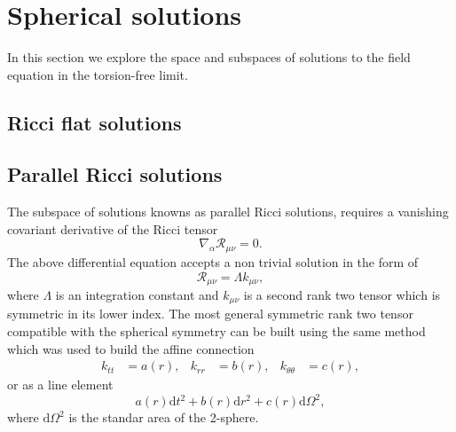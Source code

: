 \documentclass{article}
\begin{document}
\section{Spherical solutions}
\label{sec:solutions}

In this section we explore the space and subspaces of solutions to the field
equation in the torsion-free limit.

\subsection{Ricci flat solutions}


\subsection{Parallel Ricci solutions}

The subspace of solutions knowns as parallel Ricci solutions, requires a vanishing covariant
derivative of the Ricci tensor
\begin{equation}
    \nabla_\alpha \mathcal{R}_{\mu\nu} = 0.
\end{equation}
The above differential equation accepts a non trivial solution in the form of
\begin{equation}
    \label{ricci_k}
    \mathcal{R}_{\mu\nu} = \Lambda k_{\mu\nu},
\end{equation}
where $\Lambda$ is an integration constant and $k_{\mu\nu}$ is a second rank two tensor which
is symmetric in its lower index. The most general symmetric rank two tensor compatible
with the spherical symmetry can be built using the same method which was used to build
the affine connection
\begin{align}
    k_{tt} & = a(r), & k_{rr} & = b(r), & k_{\theta\theta} & = c(r),
\end{align}
or as a line element
\begin{equation}
a(r)\mathrm{d}t^2 + b(r)\mathrm{d}r^2 + c(r)\mathrm{d}\Omega^2,
\end{equation}
where $\mathrm{d}\Omega^2$ is the standar area of the 2-sphere.
\end{document}
